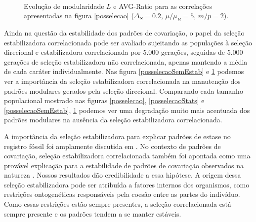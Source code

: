 \begin{figure}[htbp]
    \vspace{-18pt}
    \vspace{11pt}
    \\
    \caption{Evolução de modularidade $L$ e AVG-Ratio para as correlações
    apresentadas na figura \ref{posselecao} ($\Delta_S = 0.2$, $\mu/\mu_B=5$, $m/p=2$).}
    \label{posselecaoSemEstabStats}
\end{figure}


Ainda na questão da estabilidade dos padrões de covariação, o papel da
seleção estabilizadora correlacionada pode ser avaliado sujeitando as
populações à seleção direcional e estabilizadora correlacionada por 5.000
gerações, seguidas de 5.000 gerações de seleção estabilizadora não
correlacionada, apenas mantendo a média de cada caráter individualmente.
Nas figura \ref{posselecaoSemEstab} e \ref{posselecaoSemEstabStats}
podemos ver a importância da seleção estabilizadora correlacionada na
manutenção dos padrões modulares gerados pela seleção direcional. 
Comparando cada tamanho populacional mostrado nas figuras
\ref{posselecao}, \ref{posselecaoStats} e \ref{posselecaoSemEstab},
\ref{posselecaoSemEstabStats} podemos ver uma degradação muito mais
acentuada dos padrões modulares na ausência da seleção
estabilizadora correlacionada. 

A importância da seleção estabilizadora para explicar padrões de estase
no registro fóssil foi amplamente discutida em \cite{Charlesworth1982a}.
No contexto de padrões de covariação, seleção estabilizadora
correlacionada também foi apontada como uma provável explicação para a
estabilidade de padrões de covariação observados na natureza
\citep{Cheverud1984, Marroig2001, Porto2009}. 
Nossos resultados dão credibilidade a essa hipótese. 
A origem dessa seleção estabilizadora pode ser atribuída a fatores
internos dos organismos, como restrições ontogenéticas responsáveis pela
coesão entre as partes do indivíduo. 
Como essas restrições estão sempre presentes, a seleção correlacionada
está sempre presente e os padrões tendem a se manter estáveis. 

